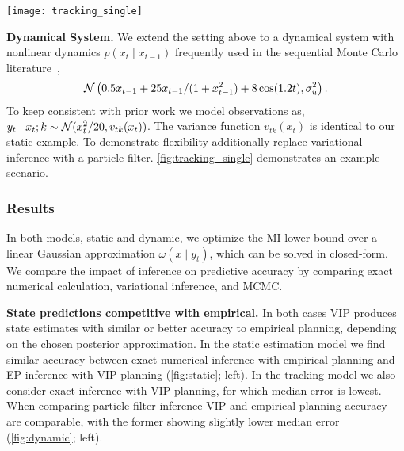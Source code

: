\begin{figure*}[!t]
  \centering
  \hspace{-3mm}
  \texttt{[image: tracking\_single]}
  \vspace{-3mm}
  \caption{\small\textbf{Nonlinear tracking example} in a field of
    $K=10$ equally spaced, stationary, sensors.  The best comparison
    is to numerical approximation to MI and the posterior distribution
    (\emph{top-center}).  For reference, we have also included an
    \emph{oracle} which selects the sensor closest to the true target
    location (\emph{left column}).  In typical cases such as this one,
    we see that VIP state error is comparable to empirical estimation
    under the same posterior approximation.  However, VIP shows lower
    accuracy when planning is computed against an approximate
    posterior, in this case particle filtering (PF).}
  \vspace{-3mm}
  \label{fig:tracking_single}
\end{figure*}

\textbf{Dynamical System.} We extend the setting above to a dynamical
system with nonlinear dynamics $p(x_t\mid x_{t-1})$ frequently used in
the sequential Monte Carlo literature~\citep{kitagawa1996monte,
  gordon1993novel, cappe2007overview},
\[
  \mathcal{N}\left(0.5 x_{t-1} + 25 x_{t-1} / (1+x_{t-1}^2)
  + 8 \cos(1.2t), \sigma_u^2\right).
\]
To keep consistent with prior work we model observations
as, \mbox{$y_t \mid x_t; k \sim \mathcal{N}(x_t^2/20, v_{tk}(x_t))$}.  The
variance function $v_{tk}(x_t)$ is identical to our static example.
To demonstrate flexibility additionally replace variational inference
with a particle filter.  \FIG\ref{fig:tracking_single} demonstrates an
example scenario.

\subsubsection{Results}
In both models, static and dynamic, we optimize the MI lower bound
over a linear Gaussian approximation $\omega(x \mid y_t)$, which can
be solved in closed-form.  We compare the impact of inference on
predictive accuracy by comparing exact numerical calculation,
variational inference, and MCMC.

\textbf{State predictions competitive with empirical.}  In both cases
VIP produces state estimates with similar or better accuracy to
empirical planning, depending on the chosen posterior approximation.
In the static estimation model we find similar accuracy between exact
numerical inference with empirical planning and EP inference with VIP
planning (\FIG\ref{fig:static}; left).  In the tracking model we also
consider exact inference with VIP planning, for which median error is
lowest.  When comparing particle filter inference VIP and empirical
planning accuracy are comparable, with the former showing slightly
lower median error (\FIG\ref{fig:dynamic}; left).


